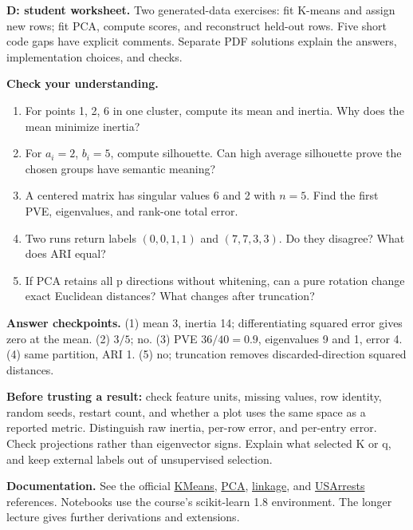 \documentclass[11pt,a4paper]{article}
\begin{document}
\textbf{D: student worksheet.} Two generated-data exercises: fit K-means and assign new rows; fit PCA,
compute scores, and reconstruct held-out rows. Five short code gaps have explicit comments.
Separate PDF solutions explain the answers, implementation choices, and checks.

\textbf{Check your understanding.}
\begin{enumerate}
\item For points 1, 2, 6 in one cluster, compute its mean and inertia. Why does the mean minimize inertia?
\item For $a_i=2$, $b_i=5$, compute silhouette. Can high average silhouette prove the chosen groups have semantic meaning?
\item A centered matrix has singular values 6 and 2 with $n=5$. Find the first PVE, eigenvalues, and rank-one total error.
\item Two runs return labels $(0,0,1,1)$ and $(7,7,3,3)$. Do they disagree? What does ARI equal?
\item If PCA retains all p directions without whitening, can a pure rotation change exact Euclidean distances?
What changes after truncation?
\end{enumerate}
\textbf{Answer checkpoints.} (1) mean 3, inertia 14; differentiating squared error gives zero at the mean.
(2) $3/5$; no. (3) PVE $36/40=0.9$, eigenvalues 9 and 1, error 4.
(4) same partition, ARI 1. (5) no; truncation removes discarded-direction squared distances.

\textbf{Before trusting a result:} check feature units, missing values, row identity, random seeds, restart count,
and whether a plot uses the same space as a reported metric. Distinguish raw inertia, per-row error, and per-entry error.
Check projections rather than eigenvector signs. Explain what selected K or q, and keep external labels out of unsupervised selection.

\textbf{Documentation.} See the official
\href{https://scikit-learn.org/1.8/modules/generated/sklearn.cluster.KMeans.html}{KMeans},
\href{https://scikit-learn.org/1.8/modules/generated/sklearn.decomposition.PCA.html}{PCA},
\href{https://docs.scipy.org/doc/scipy/reference/generated/scipy.cluster.hierarchy.linkage.html}{linkage}, and
\href{https://stat.ethz.ch/R-manual/R-devel/library/datasets/html/USArrests.html}{USArrests} references.
Notebooks use the course's scikit-learn 1.8 environment. The longer lecture gives further derivations and extensions.
\end{document}

